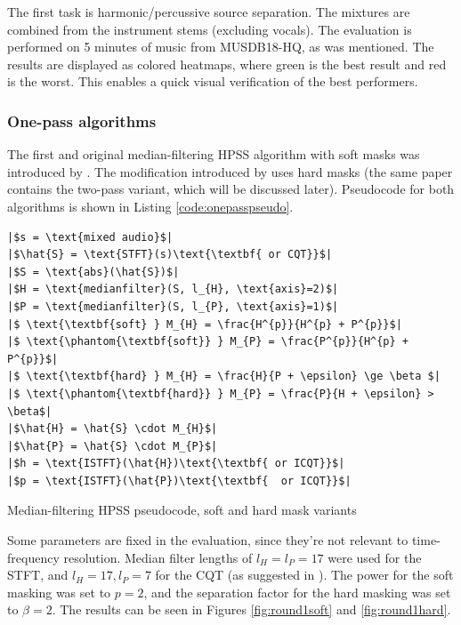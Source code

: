 \documentclass[10pt,letter]{article}
\newlength{\mintednumbersep}
\begin{document}
The first task is harmonic/percussive source separation. The mixtures are combined from the instrument stems (excluding vocals). The evaluation is performed on 5 minutes of music from MUSDB18-HQ, as was mentioned. The results are displayed as colored heatmaps, where green is the best result and red is the worst. This enables a quick visual verification of the best performers.

\subsubsection{One-pass algorithms}

The first and original median-filtering HPSS algorithm with soft masks was introduced by \citet{fitzgerald1}. The modification introduced by \citet{driedger} uses hard masks (the same paper contains the two-pass variant, which will be discussed later). Pseudocode for both algorithms is shown in Listing \ref{code:onepasspseudo}.

\begin{listing}[h]
\setlength\partopsep{-\topsep}
\begin{verbatim}
|$s = \text{mixed audio}$|
|$\hat{S} = \text{STFT}(s)\text{\textbf{ or CQT}}$|
|$S = \text{abs}(\hat{S})$|
|$H = \text{medianfilter}(S, l_{H}, \text{axis}=2)$|
|$P = \text{medianfilter}(S, l_{P}, \text{axis}=1)$|
|$ \text{\textbf{soft} } M_{H} = \frac{H^{p}}{H^{p} + P^{p}}$|
|$ \text{\phantom{\textbf{soft}} } M_{P} = \frac{P^{p}}{H^{p} + P^{p}}$|
|$ \text{\textbf{hard} } M_{H} = \frac{H}{P + \epsilon} \ge \beta $|
|$ \text{\phantom{\textbf{hard}} } M_{P} = \frac{P}{H + \epsilon} > \beta$|
|$\hat{H} = \hat{S} \cdot M_{H}$|
|$\hat{P} = \hat{S} \cdot M_{P}$|
|$h = \text{ISTFT}(\hat{H})\text{\textbf{ or ICQT}}$|
|$p = \text{ISTFT}(\hat{P})\text{\textbf{  or ICQT}}$|
\end{verbatim}
\caption{Median-filtering HPSS pseudocode, soft and hard mask variants}
\label{code:onepasspseudo}
\end{listing}

Some parameters are fixed in the evaluation, since they're not relevant to time-frequency resolution. Median filter lengths of $l_{H} = l_{P} = 17$ were used for the STFT, and $l_{H} = 17, l_{P} = 7$ for the CQT (as suggested in \cite{fitzgerald2}). The power for the soft masking was set to $p = 2$, and the separation factor for the hard masking was set to $\beta = 2$. The results can be seen in Figures \ref{fig:round1soft} and \ref{fig:round1hard}.
\end{document}
